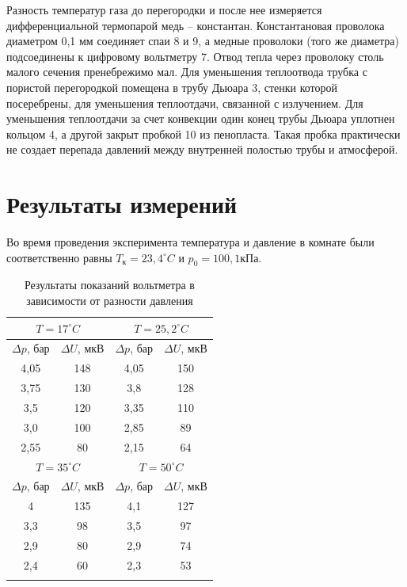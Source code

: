 \documentclass[a4paper,12pt]{article} %
\begin{document}
Разность температур газа до перегородки и после нее измеряется дифференциальной термопарой медь -- константан. Константановая проволока диаметром 0,1 мм соединяет спаи 8 и 9, а медные проволоки (того же диаметра) подсоединены к цифровому вольтметру 7. Отвод тепла через проволоку столь малого сечения пренебрежимо мал. Для уменьшения теплоотвода трубка с пористой перегородкой помещена в трубу Дьюара 3, стенки которой посеребрены, для уменьшения теплоотдачи, связанной с излучением. Для уменьшения теплоотдачи за счет конвекции один конец трубы Дьюара уплотнен кольцом 4, а другой закрыт пробкой 10 из пенопласта. Такая пробка практически не создает перепада давлений между внутренней полостью трубы и атмосферой.

\section{Результаты измерений}

Во время проведения эксперимента температура и давление в комнате были соответственно равны $T_\text{к} = 23,4 ^\circ C$ и $p_0 = 100,1 $кПа.

\begin{table}[H]
    \begin{tabular}{|c|c||c|c|}
    \hline
    \multicolumn{2}{|c||}{$T = 17 ^\circ C$} & \multicolumn{2}{|c|}{$T = 25,2 ^\circ C$} \\ \hline
    $\Delta p$, бар & $\Delta U$, мкВ & $\Delta p$, бар & $\Delta U$, мкВ \\ \hline
    4,05 & 148 & 4,05 & 150 \\ \hline
    3,75 & 130 & 3,8  & 128 \\ \hline
    3,5  & 120 & 3,35 & 110 \\ \hline
    3,0  & 100 & 2,85 & 89 \\ \hline
    2,55 & 80  & 2,15 & 64 \\ \hline \hline
    \multicolumn{2}{|c||}{$T = 35 ^\circ C$} & \multicolumn{2}{|c|}{$T = 50 ^\circ C$} \\ \hline 
    $\Delta p$, бар & $\Delta U$, мкВ & $\Delta p$, бар & $\Delta U$, мкВ \\ \hline
    4   & 135 & 4,1 & 127 \\ \hline
    3,3 & 98  & 3,5 & 97 \\ \hline
    2,9 & 80  & 2,9 & 74 \\ \hline
    2,4 & 60  & 2,3 & 53 \\ \hline
    \label{results}
    \end{tabular}
    \caption {Результаты показаний вольтметра в зависимости от разности давления}
\end{table}
\end{document}
